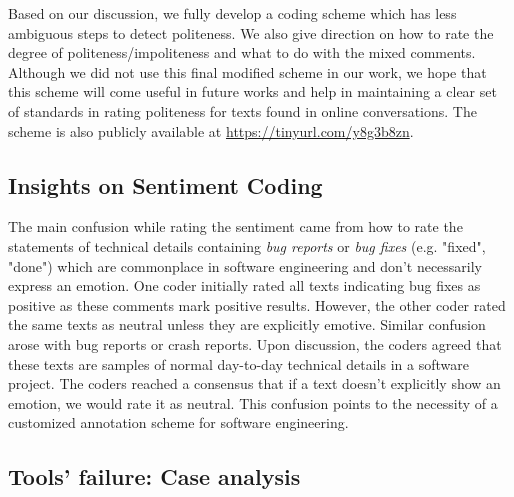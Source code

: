 Based on our discussion, 
we fully develop a coding scheme
which has less ambiguous steps to detect politeness. 
We also give direction on 
how to rate the degree of politeness/impoliteness 
and what to do with the mixed comments. 
Although we did not use this final modified scheme in our work, 
we hope that this scheme will come useful in future works 
and help in maintaining a clear set of standards 
in rating politeness for texts found in online conversations. 
The scheme is also publicly available at \href{https://tinyurl.com/y8g3b8zn}{https://tinyurl.com/y8g3b8zn}.

\subsection{Insights on Sentiment Coding}\label{sentschemedis}
The main confusion 
while rating the sentiment
came from how to rate the statements of technical details 
containing \textit{bug reports} or \textit{bug fixes} 
(e.g. "fixed", "done") 
which are commonplace in software engineering and 
don't necessarily express an emotion. 
One coder initially rated all texts indicating bug fixes 
as positive 
as these comments mark positive results. 
However, the other coder rated the same texts as neutral 
unless they are explicitly emotive. 
Similar confusion arose with bug reports or crash reports. 
Upon discussion, the coders agreed that 
these texts are samples of normal day-to-day technical details 
in a software project. 
The coders reached a consensus 
that if a text doesn't explicitly show an emotion, 
we would rate it as neutral. 
This confusion points 
to the necessity of a customized annotation scheme 
for software engineering. 

\subsection{Tools' failure: Case analysis}
 
